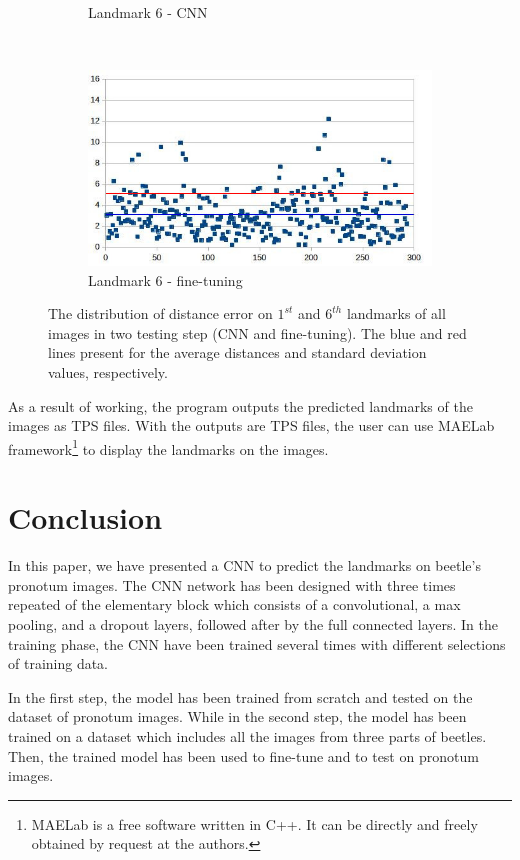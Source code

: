 \documentclass[10pt]{article}
\begin{document}
\begin{figure}[htbp]
\begin{subfigure}[t]{0.25\textwidth}
        \caption{\small{Landmark 6 - CNN}}
        \label{figsub111}
    \end{subfigure}%
    ~ 
    \begin{subfigure}[t]{0.25\textwidth}
        \centering
        \includegraphics[scale=.32]{images/lm6_finetuning_2}
        \caption{\small{Landmark 6 - fine-tuning}}
        \label{figsub222}
    \end{subfigure}
    \caption{\small{The distribution of distance error on $1^{st}$ and $6^{th}$ landmarks of all images in two testing step (CNN and fine-tuning). The blue and red lines present for the average distances and standard deviation values, respectively.}}
    \label{figrsexample2}
\end{figure}

As a result of working, the program outputs the
predicted landmarks of the images as TPS files. With the outputs are TPS files,
the user can use MAELab framework\footnote{MAELab is a free software written in C++. It can be directly and freely
obtained by request at the authors.} to display the
landmarks on the images.
\section{Conclusion}
In this paper, we have presented a CNN to predict the landmarks on beetle's pronotum images. The CNN network has been designed with three times repeated of the elementary block which consists of a convolutional, a max pooling, and a dropout layers, followed after by the full connected layers. In the training phase, the CNN have been trained several times with different selections of training data.

In the first step, the model has been trained from scratch and tested on the dataset of pronotum images. While in the second step, the model has been trained on a dataset which includes all the images from three parts of beetles. Then, the trained model has been used to fine-tune and to test on pronotum images.
\end{document}
